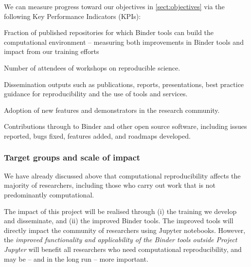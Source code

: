 We can measure progress toward our objectives in \ref{sect:objectives}
via the following Key Performance Indicators (KPIs):
\begin{compactenum}
\item \label{kpi:binder-publications} Fraction of published repositories for
  which Binder tools can build the computational environment -- measuring both
  improvements in Binder tools and impact from our training efforts
\item \label{kpi:workshop-attendees} Number of attendees of \TheProject
  workshops on reproducible science.
\item \label{kpi:dissemination} Dissemination outputs such as publications,
  reports, presentations, best practice guidance for reproducibility and the use
  of \TheProject tools and services.
\item \label{kpi:success} Adoption of new features and demonstrators in the research community.
\item \label{kpi:contributions} Contributions through \TheProject to Binder and
  other open source software, including issues reported, bugs fixed, features
  added, and roadmaps developed.
\end{compactenum}


\subsubsection{Target groups and scale of impact}

We have already discussed above that computational reproducibility affects the
majority of researchers, including those who carry out work that is not
predominantly computational.

The impact of this project will be realised through (i) the training we develop
and disseminate, and (ii) the improved Binder tools. The improved tools will
directly impact the community of researchers using Jupyter notebooks. However,
the \emph{improved functionality and applicability of the Binder tools outside Project
Jupyter} will benefit all researchers who need computational reproducibility, and
may be -- and in the long run -- more important.

\medskip

